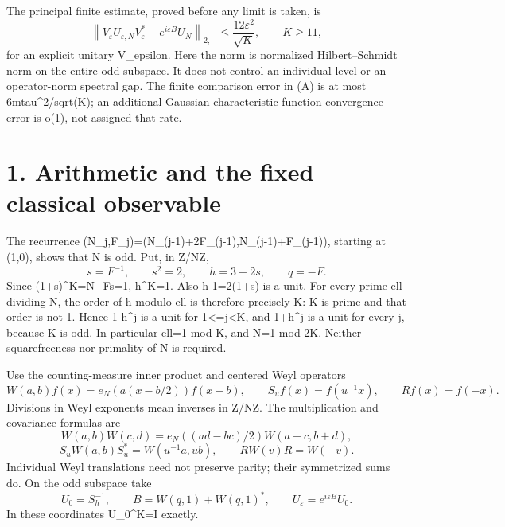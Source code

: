 \documentclass[11pt,a4paper]{article}
\begin{document}
The principal finite estimate, proved before any limit is taken, is \[
 \left\|V_\varepsilon U_{\varepsilon,N}V_\varepsilon^*
            -e^{i\varepsilon\overline B}U_N\right\|_{2,-}
       \leq \frac{12\varepsilon^2}{\sqrt K},\qquad K\geq11,        \tag{D}
\] for an explicit unitary V\_epsilon. Here the norm is normalized Hilbert--Schmidt norm on the entire odd subspace. It does not control an individual level or an operator-norm spectral gap. The finite comparison error in (A) is at most 6\textbar m\textbar tau\^{}2/sqrt(K); an additional Gaussian characteristic-function convergence error is o(1), not assigned that rate.

\hypertarget{arithmetic-and-the-fixed-classical-observable}{%
\section{1. Arithmetic and the fixed classical observable}\label{arithmetic-and-the-fixed-classical-observable}}

The recurrence (N\_j,F\_j)=(N\_(j-1)+2F\_(j-1),N\_(j-1)+F\_(j-1)), starting at (1,0), shows that N is odd. Put, in Z/NZ, \[
 s=F^{-1},\qquad s^2=2,\qquad h=3+2s,\qquad q=-F.
\] Since (1+s)\^{}K=N+Fs=1, h\^{}K=1. Also h-1=2(1+s) is a unit. For every prime ell dividing N, the order of h modulo ell is therefore precisely K: K is prime and that order is not 1. Hence 1-h\^{}j is a unit for 1\textless=j\textless K, and 1+h\^{}j is a unit for every j, because K is odd. In particular ell=1 mod K, and N=1 mod 2K. Neither squarefreeness nor primality of N is required.

Use the counting-measure inner product and centered Weyl operators \[
 W(a,b)f(x)=e_N(a(x-b/2))f(x-b),\qquad
 S_u f(x)=f(u^{-1}x),\qquad Rf(x)=f(-x).
\] Divisions in Weyl exponents mean inverses in Z/NZ. The multiplication and covariance formulas are \[
 W(a,b)W(c,d)=e_N((ad-bc)/2)W(a+c,b+d),
\] \[
 S_uW(a,b)S_u^*=W(u^{-1}a,ub),\qquad RW(v)R=W(-v).
\] Individual Weyl translations need not preserve parity; their symmetrized sums do. On the odd subspace take \[
 U_0=S_h^{-1},\qquad B=W(q,1)+W(q,1)^*,\qquad
 U_\varepsilon=e^{i\varepsilon B}U_0.                            \tag{1}
\] In these coordinates U\_0\^{}K=I exactly.
\end{document}
